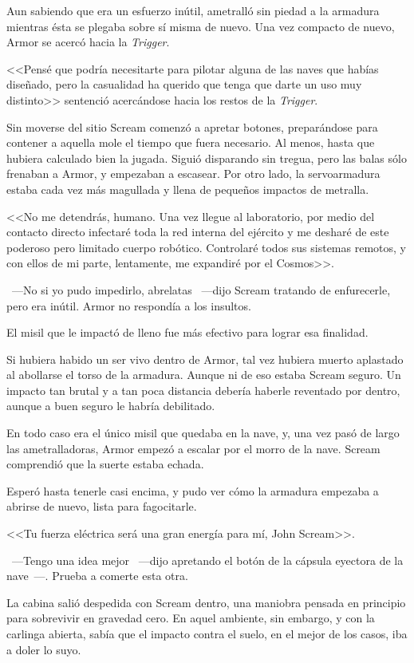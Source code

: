 Aun sabiendo que era un esfuerzo inútil, ametralló sin piedad a la armadura mientras ésta se plegaba sobre sí misma de nuevo. Una vez compacto de nuevo, Armor se acercó hacia la \emph{Trigger}.

<<Pensé que podría necesitarte para pilotar alguna de las naves que habías diseñado, pero la casualidad ha querido que tenga que darte un uso muy distinto>> sentenció acercándose hacia los restos de la \emph{Trigger}.

Sin moverse del sitio Scream comenzó a apretar botones, preparándose para contener a aquella mole el tiempo que fuera necesario. Al menos, hasta que hubiera calculado bien la jugada. Siguió disparando sin tregua, pero las balas sólo frenaban a Armor, y empezaban a escasear. Por otro lado, la servoarmadura estaba cada vez más magullada y llena de pequeños impactos de metralla.

<<No me detendrás, humano. Una vez llegue al laboratorio, por medio del contacto directo infectaré toda la red interna del ejército y me desharé de este poderoso pero limitado cuerpo robótico. Controlaré todos sus sistemas remotos, y con ellos de mi parte, lentamente, me expandiré por el Cosmos>>.

~---No si yo pudo impedirlo, abrelatas ~---dijo Scream tratando de enfurecerle, pero era inútil. Armor no respondía a los insultos.

El misil que le impactó de lleno fue más efectivo para lograr esa finalidad.

Si hubiera habido un ser vivo dentro de Armor, tal vez hubiera muerto aplastado al abollarse el torso de la armadura. Aunque ni de eso estaba Scream seguro. Un impacto tan brutal y a tan poca distancia debería haberle reventado por dentro, aunque a buen seguro le habría debilitado.

En todo caso era el único misil que quedaba en la nave, y, una vez pasó de largo las ametralladoras, Armor empezó a escalar por el morro de la nave. Scream comprendió que la suerte estaba echada.

Esperó hasta tenerle casi encima, y pudo ver cómo la armadura empezaba a abrirse de nuevo, lista para fagocitarle.

<<Tu fuerza eléctrica será una gran energía para mí, John Scream>>.

~---Tengo una idea mejor ~---dijo apretando el botón de la cápsula eyectora de la nave~---. Prueba a comerte esta otra.

La cabina salió despedida con Scream dentro, una maniobra pensada en principio para sobrevivir en gravedad cero. En aquel ambiente, sin embargo, y con la carlinga abierta, sabía que el impacto contra el suelo, en el mejor de los casos, iba a doler lo suyo.


